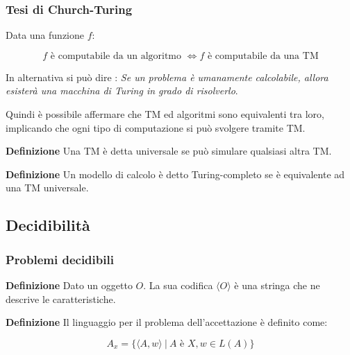 \documentclass{article}
\begin{document}
\subsubsection{Tesi di Church-Turing}

Data una funzione $f$:

$$f \text{ è computabile da un algoritmo }\iff f \text{ è computabile da una TM}$$\newline

\noindent In alternativa si può dire :\textit{ Se un problema è umanamente calcolabile, allora esisterà una macchina di Turing in grado di risolverlo}.\newline

\noindent Quindi è possibile affermare che TM ed algoritmi sono equivalenti tra loro, implicando che ogni tipo di computazione si può svolgere tramite TM.\newline

\noindent\textbf{Definizione} Una TM è detta universale se può simulare qualsiasi altra TM.\newline

\noindent\textbf{Definizione} Un modello di calcolo è detto Turing-completo se è equivalente ad una TM universale.\newline

\subsection{Decidibilità}

\subsubsection{Problemi decidibili}

\textbf{Definizione} Dato un oggetto $O$. La sua codifica $\langle O\rangle$ è una stringa che ne descrive le caratteristiche.\newline

\noindent\textbf{Definizione} Il linguaggio per il problema dell'accettazione è definito come:

$$A_x=\{\langle A,w\rangle\ |\ A\text{ è } X,w\in L(A) \}$$\newline
\end{document}

